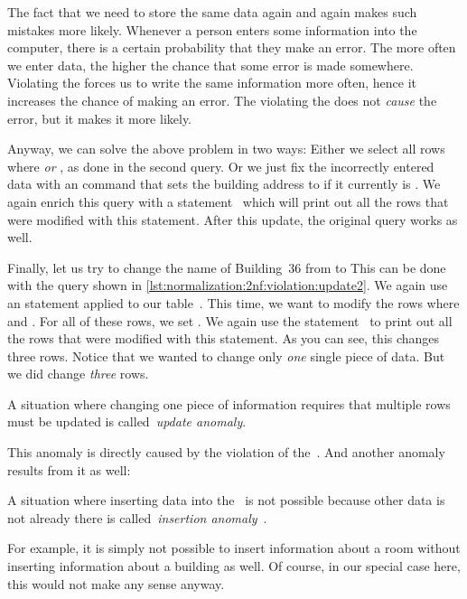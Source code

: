 The fact that we need to store the same data again and again makes such mistakes more likely.
Whenever a person enters some information into the computer, there is a certain probability that they make an error.
The more often we enter data, the higher the chance that some error is made somewhere.
Violating the  forces us to write the same information more often, hence it increases the chance of making an error.
The violating the  does not \emph{cause} the error, but it makes it more likely.%
%
\begin{sloppypar}%
Anyway, we can solve the above problem in two ways:
Either we select all rows where  \emph{or} , as done in the second query.
Or we just fix the incorrectly entered data with an  command that sets the building address to  if it currently is .
We again enrich this query with a  statement~\cite{PGDG:PD:RDFMR} which will print out all the rows that were modified with this statement.
After this update, the original query works as well.%
\end{sloppypar}%
%
Finally, let us try to change the name of Building~36 from  to 
This can be done with the query shown in \cref{lst:normalization:2nf:violation:update2}.
We again use an  statement applied to our table~.
This time, we want to modify the rows where  and .
For all of these rows, we set .
We again use the  statement~\cite{PGDG:PD:RDFMR} to print out all the rows that were modified with this statement.
As you can see, this changes three rows.
Notice that we wanted to change only \emph{one} single piece of data.
But we did change \emph{three} rows.%
%
\begin{definition}%
\label{def:updateAnomaly}%
A situation where changing one piece of information requires that multiple rows must be updated is called~\emph{update anomaly}.%
\end{definition}%
%
This anomaly is directly caused by the violation of the~.
And another anomaly results from it as well:%
%
\begin{definition}%
A situation where inserting data into the \db\ is not possible because other data is not already there is called~\emph{insertion anomaly}~\cite{S2024D:RNDAFDNF}.%
\end{definition}%
%
For example, it is simply not possible to insert information about a room without inserting information about a building as well.
Of course, in our special case here, this would not make any sense anyway.

